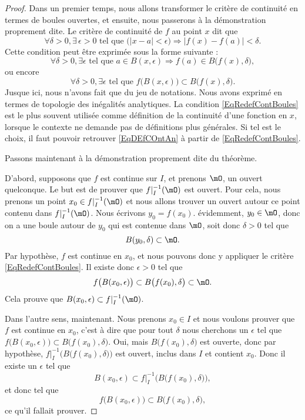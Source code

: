 \begin{proof}

Dans un premier temps, nous allons transformer le critère de continuité en termes de boules ouvertes, et ensuite, nous passerons à la démonstration proprement dite. Le critère de continuité de $f$ au point $x$ dit que
\begin{equation}        \label{EqDEfCOntAn}
  \forall \delta>0,\exists\,\epsilon>0\text{ tel que }\big( | x-a |< \epsilon \big)\Rightarrow| f(x)-f(a) |<\delta.
\end{equation}
Cette condition peut être exprimée sous la forme suivante :
\[ 
  \forall \delta>0,\exists\epsilon\text{ tel que } a\in B(x,\epsilon)\Rightarrow f(a)\in B\big( f(x),\delta \big),
\]
ou encore
\begin{equation}        \label{EqRedefContBoules}
  \forall \delta>0,\exists\epsilon\text{ tel que } f\big( B(x,\epsilon) \big)\subset B\big( f(x),\delta \big).
\end{equation}
Jusque ici, nous n'avons fait que du jeu de notations. Nous avons exprimé en termes de topologie des inégalités analytiques. La condition \eqref{EqRedefContBoules} est le plus souvent utilisée comme définition de la continuité d'une fonction en \( x\), lorsque le contexte ne demande pas de définitions plus générales. Si tel est le choix, il faut pouvoir retrouver \eqref{EqDEfCOntAn} à partir de \eqref{EqRedefContBoules}.

Passons maintenant à la démonstration proprement dite du théorème. 

D'abord, supposons que $f$ est continue sur $I$, et prenons $\mO$, un ouvert quelconque. Le but est de prouver que $f|_I^{-1}(\mO)$ est ouvert. Pour cela, nous prenons un point $x_0\in f|_I^{-1}(\mO)$ et nous allons trouver un ouvert autour ce point contenu dans $f|_I^{-1}(\mO)$. Nous écrivons $y_0=f(x_0)$. évidemment, $y_0\in\mO$, donc on a une boule autour de $y_0$ qui est contenue dans $\mO$, soit donc $\delta>0$ tel que
\[  
  B(y_0,\delta)\subset\mO.
\]
Par hypothèse, $f$ est continue en $x_0$, et nous pouvons donc y appliquer le critère \eqref{EqRedefContBoules}. Il existe donc $\epsilon>0$ tel que 
\[ 
  f\big( B(x_0,\epsilon) \big)\subset B\big( f(x_0),\delta \big)\subset\mO.
\]
Cela prouve que $B(x_0,\epsilon)\subset f|_I^{-1}(\mO)$.

Dans l'autre sens, maintenant. Nous prenons $x_0\in I$ et nous voulons prouver que $f$ est continue en $x_0$, c'est à dire que pour tout $\delta$ nous cherchons un $\epsilon$ tel que $f\big( B(x_0,\epsilon) \big)\subset B\big( f(x_0),\delta \big)$. Oui, mais $B\big( f(x_0),\delta \big)$ est ouverte, donc par hypothèse, $f|_I^{-1}\Big( B\big( f(x_0),\delta \big) \Big)$ est ouvert, inclus dans $I$ et contient $x_0$. Donc il existe un $\epsilon$ tel que
\[ 
  B(x_0,\epsilon)\subset f|_I^{-1}\Big( B\big( f(x_0),\delta \big) \Big),
\]
et donc tel que 
\[ 
  f\big( B(x_0,\epsilon) \big)\subset B\big( f(x_0),\delta \big),
\]
ce qu'il fallait prouver.
\end{proof}

